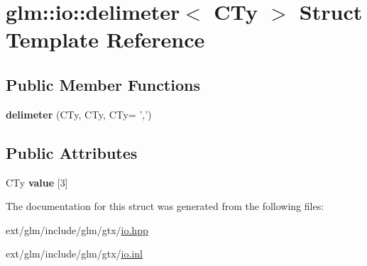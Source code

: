 \hypertarget{structglm_1_1io_1_1delimeter}{\section{glm\-:\-:io\-:\-:delimeter$<$ C\-Ty $>$ Struct Template Reference}
\label{structglm_1_1io_1_1delimeter}
}
\subsection*{Public Member Functions}
\begin{DoxyCompactItemize}
\item 
\hypertarget{structglm_1_1io_1_1delimeter_acd4b6e1e816d423a069688c4772b9500}{{\bfseries delimeter} (C\-Ty, C\-Ty, C\-Ty= ',')}\label{structglm_1_1io_1_1delimeter_acd4b6e1e816d423a069688c4772b9500}

\end{DoxyCompactItemize}
\subsection*{Public Attributes}
\begin{DoxyCompactItemize}
\item 
\hypertarget{structglm_1_1io_1_1delimeter_a9ade129dae50c4f716f724e7425f9c68}{C\-Ty {\bfseries value} \mbox{[}3\mbox{]}}\label{structglm_1_1io_1_1delimeter_a9ade129dae50c4f716f724e7425f9c68}

\end{DoxyCompactItemize}


The documentation for this struct was generated from the following files\-:\begin{DoxyCompactItemize}
\item 
ext/glm/include/glm/gtx/\hyperlink{io_8hpp}{io.\-hpp}\item 
ext/glm/include/glm/gtx/\hyperlink{io_8inl}{io.\-inl}\end{DoxyCompactItemize}

